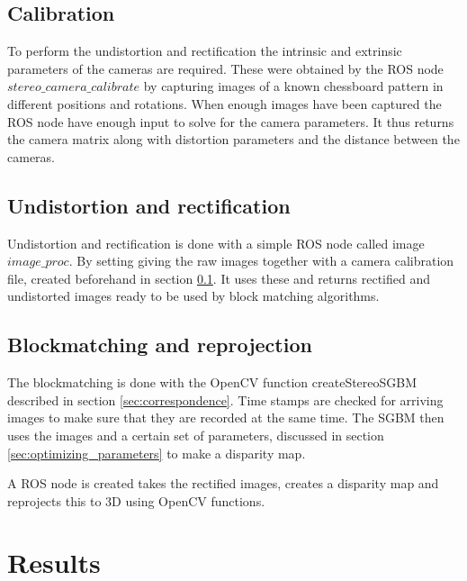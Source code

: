 \subsection{Calibration} \label{sec:calibration}

To perform the undistortion and rectification the intrinsic and extrinsic parameters of the cameras are required. These were obtained by the ROS node $stereo\_camera\_calibrate$ by capturing images of a known chessboard pattern in different positions and rotations. When enough images have been captured the ROS node have enough input to solve for the camera parameters. It thus returns the camera matrix along with distortion parameters and the distance between the cameras.


\subsection{Undistortion and rectification}

Undistortion and rectification is done with a simple ROS node called image $image\_proc$. By setting giving the raw images together with a camera calibration file, created beforehand in section \ref{sec:calibration}. It uses these and returns rectified and undistorted images ready to be used by block matching algorithms.

\subsection{Blockmatching and reprojection}

The blockmatching is done with the OpenCV function createStereoSGBM \cite{opencv} described in section \ref{sec:correspondence}. Time stamps are checked for arriving images to make sure that they are recorded at the same time. The SGBM then uses the images and a certain set of parameters, discussed in section \ref{sec:optimizing_parameters} to make a disparity map. 


A ROS node is created takes the rectified images, creates a disparity map and reprojects this to 3D using OpenCV functions.

\section{Results}

